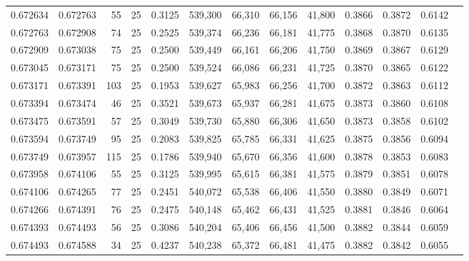 \begin{tabular}{rrrrrrrrrrrrr}
0.672634 & 0.672763 &    55 &  25 &                                     0.3125 & 539,300 &  66,310 &  66,156 &  41,800 & 0.3866 & 0.3872 & 0.6142 \\
0.672763 & 0.672908 &    74 &  25 &                                     0.2525 & 539,374 &  66,236 &  66,181 &  41,775 & 0.3868 & 0.3870 & 0.6135 \\
0.672909 & 0.673038 &    75 &  25 &                                     0.2500 & 539,449 &  66,161 &  66,206 &  41,750 & 0.3869 & 0.3867 & 0.6129 \\
0.673045 & 0.673171 &    75 &  25 &                                     0.2500 & 539,524 &  66,086 &  66,231 &  41,725 & 0.3870 & 0.3865 & 0.6122 \\
0.673171 & 0.673391 &   103 &  25 &                                     0.1953 & 539,627 &  65,983 &  66,256 &  41,700 & 0.3872 & 0.3863 & 0.6112 \\
0.673394 & 0.673474 &    46 &  25 &                                     0.3521 & 539,673 &  65,937 &  66,281 &  41,675 & 0.3873 & 0.3860 & 0.6108 \\
0.673475 & 0.673591 &    57 &  25 &                                     0.3049 & 539,730 &  65,880 &  66,306 &  41,650 & 0.3873 & 0.3858 & 0.6102 \\
0.673594 & 0.673749 &    95 &  25 &                                     0.2083 & 539,825 &  65,785 &  66,331 &  41,625 & 0.3875 & 0.3856 & 0.6094 \\
0.673749 & 0.673957 &   115 &  25 &                                     0.1786 & 539,940 &  65,670 &  66,356 &  41,600 & 0.3878 & 0.3853 & 0.6083 \\
0.673958 & 0.674106 &    55 &  25 &                                     0.3125 & 539,995 &  65,615 &  66,381 &  41,575 & 0.3879 & 0.3851 & 0.6078 \\
0.674106 & 0.674265 &    77 &  25 &                                     0.2451 & 540,072 &  65,538 &  66,406 &  41,550 & 0.3880 & 0.3849 & 0.6071 \\
0.674266 & 0.674391 &    76 &  25 &                                     0.2475 & 540,148 &  65,462 &  66,431 &  41,525 & 0.3881 & 0.3846 & 0.6064 \\
0.674393 & 0.674493 &    56 &  25 &                                     0.3086 & 540,204 &  65,406 &  66,456 &  41,500 & 0.3882 & 0.3844 & 0.6059 \\
0.674493 & 0.674588 &    34 &  25 &                                     0.4237 & 540,238 &  65,372 &  66,481 &  41,475 & 0.3882 & 0.3842 & 0.6055 \\

\end{tabular}
